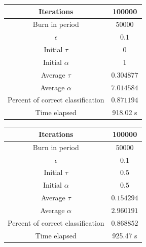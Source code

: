 \documentclass{siamart1116}
\begin{document}
\begin{center}
\begin{tabular}{| c | c |}
\hline
Iterations & 100000 \\ \hline
Burn in period & 50000 \\ \hline
$\epsilon$ & $0.1$\\ \hline
Initial $\tau$ & $0$\\ \hline
Initial $\alpha$ & $1$\\ \hline
Average $\tau$ & $0.304877$\\ \hline
Average $\alpha$ & $7.014584$\\ \hline
Percent of correct classification & $0.871194$ \\ \hline
Time elapsed & 918.02 s \\ \hline
\end{tabular}
\end{center}

\begin{center}
\begin{tabular}{| c | c |}
\hline
Iterations & 100000 \\ \hline
Burn in period & 50000 \\ \hline
$\epsilon$ & $0.1$\\ \hline
Initial $\tau$ & $0.5$\\ \hline
Initial $\alpha$ & $0.5$\\ \hline
Average $\tau$ & $0.154294$\\ \hline
Average $\alpha$ & $2.960191$\\ \hline
Percent of correct classification & $0.868852$ \\ \hline
Time elapsed & 925.47 s \\ \hline
\end{tabular}
\end{center}
\end{document}
